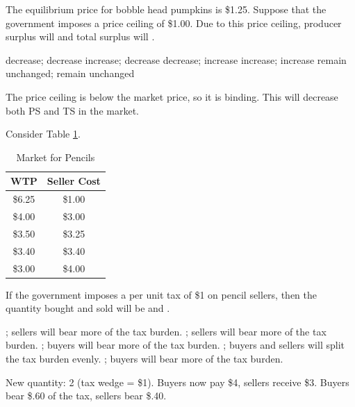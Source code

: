 \documentclass[addpoints,11pt]{exam}
\theoremstyle{definition}
\newcommand{\blank}[0]{\underline{\hspace{3cm}}}
\begin{document}
\begin{questions}
\newpage

\question The equilibrium price for bobble head pumpkins is \$1.25. Suppose that the government imposes a price ceiling of \$1.00. Due to this price ceiling, producer surplus will \blank and total surplus will \blank.

\begin{choices}
\CorrectChoice decrease; decrease
\choice increase; decrease
\choice decrease; increase
\choice increase; increase
\choice remain unchanged; remain unchanged
\end{choices}

\begin{solution}
The price ceiling is below the market price, so it is binding. This will decrease both PS and TS in the market.
\end{solution}

\question Consider Table \ref{tab3}. 

	\begin{table}[h!]
		\caption{Market for Pencils}
		\centering
		\begin{tabular}{ c|c} 
			
			WTP & Seller Cost \\
			\hline
			\$6.25 & \$1.00  \\
			\$4.00 & \$3.00  \\
			\$3.50 & \$3.25  \\
			\$3.40 & \$3.40  \\
			\$3.00 & \$4.00  \\
		\end{tabular}
		\label{tab3}
	\end{table}
	
If the government imposes a per unit tax of \$1 on pencil sellers, then the quantity bought and sold will be \blank and \blank. 
	
\begin{choices}
; sellers will bear more of the tax burden.
; sellers will bear more of the tax burden.
; buyers will bear more of the tax burden.
; buyers and sellers will split the tax burden evenly.
; buyers will bear more of the tax burden.
\end{choices}
	
\begin{solution}
New quantity: 2 (tax wedge = \$1). Buyers now pay \$4, sellers receive \$3. Buyers bear \$.60 of the tax, sellers bear \$.40.
\end{solution}


\end{questions}
\end{document}
